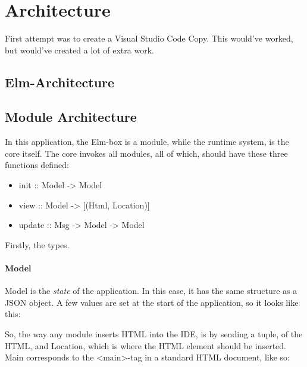 \section{Architecture}


First attempt was to create a Visual Studio Code Copy. This would've worked, but
would've created a lot of extra work.


\subsection{Elm-Architecture}


\subsection{Module Architecture}

In this application, the Elm-box is a module, while the runtime system, is the
core itself. The core invokes all modules, all of which, should have these three
functions defined:

\begin{itemize}
  \item init :: Model -> Model
  \item view :: Model -> [(Html, Location)]
  \item update :: Msg -> Model -> Model
\end{itemize}

Firstly, the types.

\paragraph{Model}
Model is the \textit{state} of the application. In this case, it has the same
structure as a JSON object. A few values are set at the start of the
application, so it looks like this:


So, the way any module inserts HTML into the IDE, is by sending a tuple, of the
HTML, and Location, which is where the HTML element should be inserted. Main
corresponds to the <main>-tag in a standard HTML document, like so:


